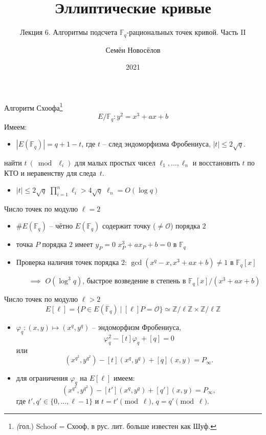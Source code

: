 \documentclass{beamer}
\title{Эллиптические кривые}
\subtitle{Лекция 6. Алгоритмы подсчета $\mathbb{F}_q$-рациональных точек кривой. Часть II}
\author{Семён Новосёлов}
\institute{БФУ им. И. Канта}
\date{2021}
\begin{document}
\frame{\titlepage}

\begin{frame}{Алгоритм Схоофа\footnote{\textit(гол.) Schoof = Схооф, в рус. лит. больше известен как Шуф.}}
\[
E/\mathbb{F}_q: y^2 = x^3 + a x + b
\]
Имеем:
\begin{itemize}
    \item $|E(\mathbb{F}_q)| = q + 1 - t$, где $t$ -- след эндоморфизма Фробениуса, $|t| \leq 2 \sqrt{q}$.
\end{itemize}

 найти $t~(\bmod~\ell_i)$ для малых простых чисел $\ell_1, \ldots, \ell_n$ и восстановить $t$ по КТО и неравенству для следа~$t$.

\begin{itemize}
    \item $|t| \leq 2 \sqrt{q}$ \structure{$\implies$} $\prod_{i=1}^{n} \ell_i > 4 \sqrt{q}$ \structure{$\implies$} $\ell_n = O(\log{q})$
\end{itemize}
\end{frame}

\begin{frame}{Число точек по модулю $\ell = 2$}
    \begin{itemize}
        \item $\#E(\mathbb{F}_q)$ -- чётно \structure{$\iff$} $E(\mathbb{F}_q)$ содержит точку ($\neq \mathcal{O}$) порядка $2$
        \item точка $P$ порядка $2$ имеет $y_P=0$ \structure{$\iff$} $x_P^3 + a x_P + b = 0$ в $\mathbb{F}_q$
        \item Проверка наличия точек порядка $2$: $\gcd(x^q - x, x^3 + a x + b) \neq 1$ в $\mathbb{F}_q[x]$
        \begin{itemize}
            \item[$\implies$] $O(\log^3{q})$, быстрое возведение в степень в $\mathbb{F}_q[x]/(x^3 + a x + b)$
         \end{itemize}
    \end{itemize}
\end{frame}

\begin{frame}{Число точек по модулю $\ell > 2$}
\[
E[\ell] = \{P \in E(\overline{\mathbb{F}}_q)~|~[\ell] P = \mathcal{O}\} \simeq \mathbb{Z}/\ell\mathbb{Z} \times \mathbb{Z}/\ell \mathbb{Z}
\]
\begin{itemize}
    \item $\varphi_q: (x, y) \mapsto (x^q, y^q)$ -- эндоморфизм Фробениуса,
    \[
    \varphi_q^2 - [t] \varphi_q + [q] = 0
    \]
    или
    \[
    (x^{q^2}, y^{q^2}) - [t] (x^{q}, y^{q}) + [q](x,y) = P_\infty.
    \]
    \item для ограничения $\varphi_q$ на $E[\ell]$ имеем:
    \[
    (x^{q^2}, y^{q^2}) - [t'] (x^{q}, y^{q}) + [q'](x,y) = P_\infty,
    \]
    где $t', q' \in \{0, ..., \ell-1\}$ и $t = t' \pmod{\ell}$, $q = q' \pmod{\ell}$.
\end{itemize}
\end{frame}
\end{document}
